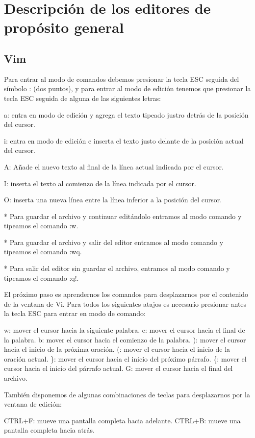 \chapter{Descripción de los editores de propósito general}

\section{Vim}
Para entrar al modo de comandos debemos presionar
la tecla ESC seguida del símbolo : (dos puntos),
y para entrar al modo de edición tenemos que
presionar la tecla ESC seguida de alguna de las
siguientes letras:

a: entra en modo de edición y agrega el texto
tipeado justro detrás de la posición del cursor.

i: entra en modo de edición e inserta el texto
justo delante de la posición actual del cursor.

A: Añade el nuevo texto al final de la línea actual
indicada por el cursor.

I: inserta el texto al comienzo de la línea indicada
por el cursor.

O: inserta una nueva línea entre la línea inferior a la
posición del cursor.

* Para guardar el archivo y continuar editándolo entramos
al modo comando y tipeamos el comando :w.

* Para guardar el archivo y salir del editor entramos al
modo comando y tipeamos el comando :wq.

* Para salir del editor sin guardar el archivo, entramos al
modo comando y tipeamos el comando :q!.

El próximo paso es aprendernos los comandos para desplazarnos
por el contenido de la ventana de Vi. Para todos los siguientes
atajos es necesario presionar antes la tecla ESC para entrar
en modo de comando:

w: mover el cursor hacia la siguiente palabra.
e: mover el cursor hacia el final de la palabra.
b: mover el cursor hacia el comienzo de la palabra.
): mover el cursor hacia el inicio de la próxima oración.
(: mover el cursor hacia el inicio de la oración actual.
\}: mover el cursor hacia el inicio del próximo párrafo.
\{: mover el cursor hacia el inicio del párrafo actual.
G: mover el cursor hacia el final del archivo.

También disponemos de algunas combinaciones de teclas para
desplazarnos por la ventana de edición:

CTRL+F: mueve una pantalla completa hacia adelante.
CTRL+B: mueve una pantalla completa hacia atrás.

